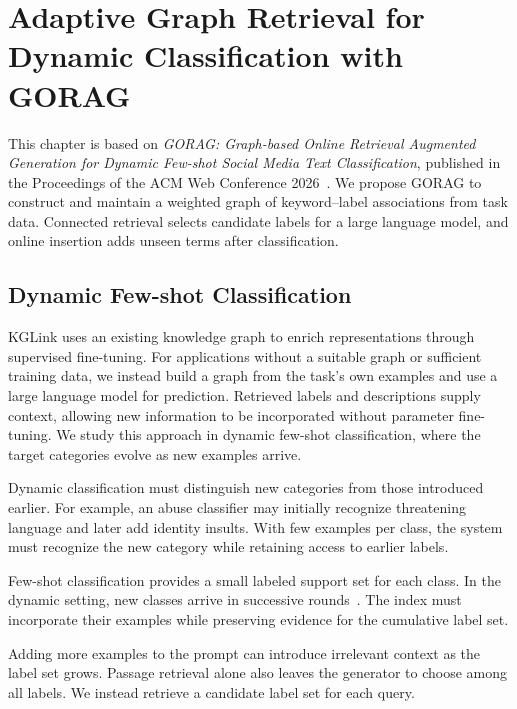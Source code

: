 \chapter{Adaptive Graph Retrieval for Dynamic Classification with GORAG}
\label{ch:gorag}

This chapter is based on \emph{GORAG: Graph-based Online Retrieval Augmented Generation for Dynamic Few-shot Social Media Text Classification}, published in the Proceedings of the ACM Web Conference 2026~\cite{gorag-paper}. We propose GORAG to construct and maintain a weighted graph of keyword--label associations from task data. Connected retrieval selects candidate labels for a large language model, and online insertion adds unseen terms after classification.

\section{Dynamic Few-shot Classification}
\label{sec:gorag:task}

KGLink uses an existing knowledge graph to enrich representations through supervised fine-tuning. For applications without a suitable graph or sufficient training data, we instead build a graph from the task's own examples and use a large language model for prediction. Retrieved labels and descriptions supply context, allowing new information to be incorporated without parameter fine-tuning. We study this approach in dynamic few-shot classification, where the target categories evolve as new examples arrive.

Dynamic classification must distinguish new categories from those introduced earlier. For example, an abuse classifier may initially recognize threatening language and later add identity insults. With few examples per class, the system must recognize the new category while retaining access to earlier labels.

Few-shot classification provides a small labeled support set for each class. In the dynamic setting, new classes arrive in successive rounds~\cite{gorag-xia-etal-2021-incremental}. The index must incorporate their examples while preserving evidence for the cumulative label set.

Adding more examples to the prompt can introduce irrelevant context as the label set grows. Passage retrieval alone also leaves the generator to choose among all labels. We instead retrieve a candidate label set for each query.


